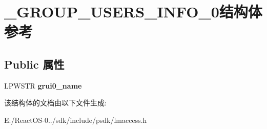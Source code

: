 \hypertarget{struct___g_r_o_u_p___u_s_e_r_s___i_n_f_o__0}{}\section{\+\_\+\+G\+R\+O\+U\+P\+\_\+\+U\+S\+E\+R\+S\+\_\+\+I\+N\+F\+O\+\_\+0结构体 参考}
\label{struct___g_r_o_u_p___u_s_e_r_s___i_n_f_o__0}
\subsection*{Public 属性}
\begin{DoxyCompactItemize}
\item 
\mbox{\label{struct___g_r_o_u_p___u_s_e_r_s___i_n_f_o__0_aa882bf92be74d8acd4ba1c0edc2b8a24}} 
L\+P\+W\+S\+TR {\bfseries grui0\+\_\+name}
\end{DoxyCompactItemize}


该结构体的文档由以下文件生成\+:\begin{DoxyCompactItemize}
\item 
E\+:/\+React\+O\+S-\/0../sdk/include/psdk/lmaccess.\+h\end{DoxyCompactItemize}
